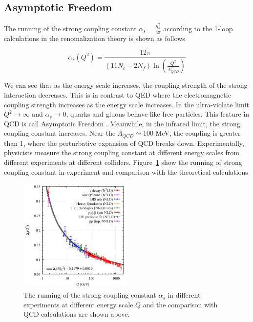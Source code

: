 \subsection{Asymptotic Freedom}

The running of the strong coupling constant $\alpha_s = \frac{g_s^2}{4\pi}$ according to the 1-loop calculations in the renomalization theory \cite{QCDRunning} is shown as follows

\begin{equation}
\alpha_{s} (Q^2) = \frac{12\pi}{(11 N_{c} - 2 N_{f}) \ln(\frac{Q^2}{\Lambda_{QCD}^2})}
\end{equation}

We can see that as the energy scale increases, the coupling strength of the strong interaction decreases. This is in contrast to QED where the electromagnetic coupling strength increases as the energy scale increases. In the ultra-violate limit $Q^2 \rightarrow \infty$ and $\alpha_{s} \rightarrow 0$, quarks and gluons behave like free particles. This feature in QCD is call Asymptotic Freedom \cite{QCDAsym}. Meanwhile, in the infrared limit, the strong coupling constant increases. Near the $\Lambda_{QCD} \simeq$100 MeV, the coupling is greater than 1, where the perturbative expansion of QCD breaks down. Experimentally, physicists measure the strong coupling constant at different energy scales from different experiments at different colliders. Figure~\ref{QCDCoupling} \cite{AlphaTheoEx} show the running of strong coupling constant in experiment and comparison with the theoretical calculations 

\begin{figure}[hbtp]
\begin{center}
\includegraphics[width=0.50\textwidth]{Figures/Chapter1/QCDCoupling.png}
\caption{The running of the strong coupling constant $\alpha_s$ in different experiments at different energy scale $Q$ and the comparison with QCD calculations are shown above.}
\label{QCDCoupling}
\end{center}
\end{figure} 

